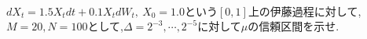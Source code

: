 \documentclass[dvipdfmx,cjk]{beamer}
\numberwithin{equation}{section}
\newlength{\cellleftmargin}
\newlength{\smallerfontscale}
\def\smaller{\fontsize{\smallerfontscale}{\smallerfontscale}\selectfont}
\begin{document}
\begin{frame}
    \begin{addmargin}[\cellleftmargin]{0em}%
    {\smaller%
    \vspace{-1\smallerfontscale}%
    
    \begin{center}
    \end{center}
    { \hspace*{\fill} \\}
    }%
    \end{addmargin}%

\end{frame}
\begin{frame}
$dX_t = 1.5 X_t dt + 0.1 X_t dW_t ,\ X_0 =1.0$という$[0,1]$上の伊藤過程に対して,
$M=20,N=100$として,$\Delta = 2^{-3},\cdots,2^{-5}$に対して$\mu$の信頼区間を示せ.
\end{frame}
\end{document}

